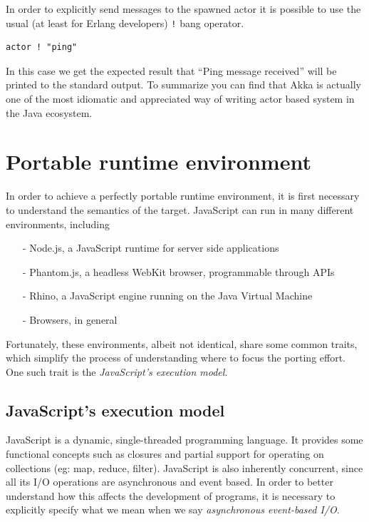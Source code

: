 \documentclass{sig-alternate}
\begin{document}
In order to explicitly send messages to the spawned actor it is possible to use the usual (at least for Erlang developers) \verb|!| bang operator.
\begin{lstlisting}
actor ! "ping"
\end{lstlisting}

In this case we get the expected result that ``Ping message received'' will be printed to the standard output.
To summarize you can find that Akka is actually one of the most idiomatic and appreciated way of writing actor based system in the Java ecosystem.

\section{Portable runtime environment}\label{sec:challenges}

In order to achieve a perfectly portable runtime environment, it is first necessary to understand the semantics of the target. 
JavaScript can run in many different environments, including
\begin{itemize}
\item[-]{Node.js, a JavaScript runtime for server side applications}
\item[-]{Phantom.js, a headless WebKit browser, programmable through APIs}
\item[-]{Rhino, a JavaScript engine running on the Java Virtual Machine}
\item[-]{Browsers, in general}
\end{itemize} 
Fortunately, these environments, albeit not identical, share some common traits, which simplify the process of understanding where to focus the porting effort. One such trait is the \textit{JavaScript's execution model}.

\subsection{JavaScript's execution model}

JavaScript is a dynamic, single-threaded programming language. It provides some functional concepts such as closures and partial support for operating on collections (eg: map, reduce, filter).
JavaScript is also inherently concurrent, since all its I/O operations are asynchronous and event based.
In order to better understand how this affects the development of programs, it is necessary to explicitly specify what we mean when we say \textit{asynchronous event-based I/O}.
\end{document}
